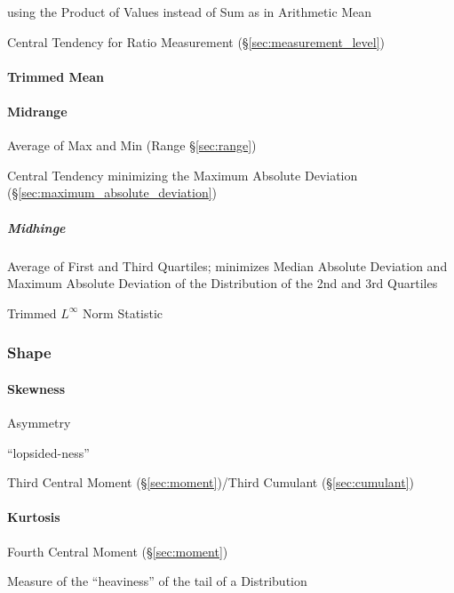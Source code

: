 using the Product of Values instead of Sum as in Arithmetic Mean

Central Tendency for Ratio Measurement (\S\ref{sec:measurement_level})



\paragraph{Trimmed Mean}\label{sec:trimmed_mean}\hfill



\paragraph{Midrange}\label{sec:midrange}\hfill

Average of Max and Min (Range \S\ref{sec:range})

Central Tendency minimizing the Maximum Absolute Deviation
(\S\ref{sec:maximum_absolute_deviation})



\subparagraph{Midhinge}\label{sec:midhinge}\hfill

Average of First and Third Quartiles; minimizes Median Absolute Deviation and
Maximum Absolute Deviation of the Distribution of the 2nd and 3rd Quartiles

Trimmed $L^\infty$ Norm Statistic



\subsubsection{Shape}\label{sec:distribution_shape}

\paragraph{Skewness}\label{sec:skewness}\hfill

Asymmetry %

``lopsided-ness''

Third Central Moment (\S\ref{sec:moment})/Third Cumulant (\S\ref{sec:cumulant})



\paragraph{Kurtosis}\label{sec:kurtosis}\hfill

Fourth Central Moment (\S\ref{sec:moment})

Measure of the ``heaviness'' of the tail of a Distribution



